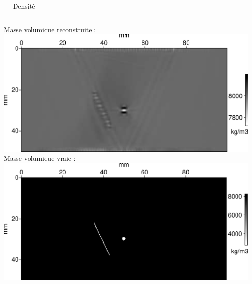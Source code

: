 \documentclass[10pt,xcolor=x11names,compress, notes=show]{beamer}%
\begin{document}
\begin{frame}{\insertsectionhead~-- Densité}
\begin{footnotesize}
\begin{columns}
			\centering
			Masse volumique reconstruite :  \\[0.2cm]
			\includegraphics[width=\textwidth]{img/rho_mono/rho_mono.png}\\
	
			\centering
			Masse volumique vraie : \\[0.2cm]
			\includegraphics[width=\textwidth]{img/rho_true.png}
		\end{columns}

\end{footnotesize}		
\end{frame}
\end{document}
